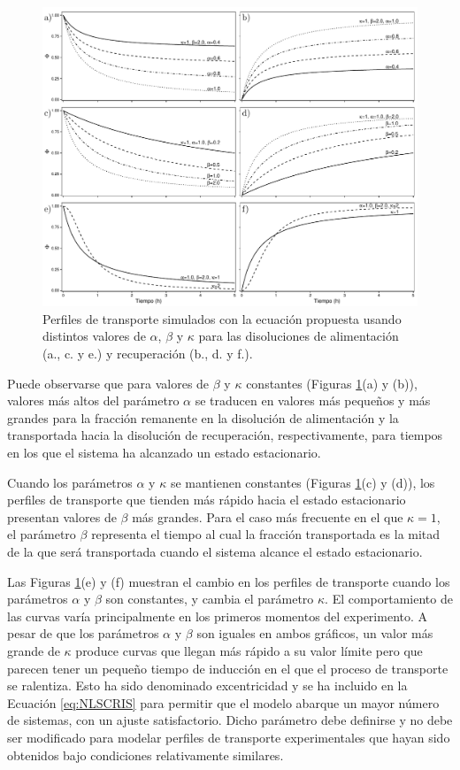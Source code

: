\begin{figure}[htbp]
    \centering
    \includegraphics[width = \textwidth]{chap2/images/thesis-models.pdf}
    \caption[Perfiles de transporte simulados con la ecuación propuesta.]{Perfiles de transporte simulados con la ecuación propuesta usando distintos valores de $\alpha$, $\beta$ y $\kappa$ para las disoluciones de alimentación (a., c. y e.) y recuperación (b., d. y f.).}
    \label{fig:Modelssim}
\end{figure}

Puede observarse que para valores de $\beta$ y $\kappa$ constantes (Figuras \ref{fig:Modelssim}(a) y (b)), valores más altos del parámetro $\alpha$ se traducen en valores más pequeños y más grandes para la fracción remanente en la disolución de alimentación y la transportada hacia la disolución de recuperación, respectivamente, para tiempos en los que el sistema ha alcanzado un estado estacionario. 

Cuando los parámetros $\alpha$ y $\kappa$ se mantienen constantes (Figuras \ref{fig:Modelssim}(c) y (d)), los perfiles de transporte que tienden más rápido hacia el estado estacionario presentan valores de $\beta$ más grandes. Para el caso más frecuente en el que $\kappa=1$, el parámetro $\beta$ representa el tiempo al cual la fracción transportada es la mitad de la que será transportada  cuando el sistema alcance el estado estacionario.

Las Figuras \ref{fig:Modelssim}(e) y (f) muestran el cambio en los perfiles de transporte cuando los parámetros $\alpha$ y $\beta$ son constantes, y cambia el parámetro $\kappa$. El comportamiento de las curvas varía principalmente en los primeros momentos del experimento. A pesar de que los parámetros $\alpha$ y $\beta$ son iguales en ambos gráficos, un valor más grande de $\kappa$ produce curvas que llegan más rápido a su valor límite pero que parecen tener un pequeño tiempo de inducción en el que el proceso de transporte se ralentiza. Esto ha sido denominado excentricidad y se ha incluido en la Ecuación \ref{eq:NLSCRIS} para permitir que el modelo abarque un mayor número de sistemas, con un ajuste satisfactorio. Dicho parámetro debe definirse y no debe ser modificado para modelar perfiles de transporte experimentales que hayan sido obtenidos bajo condiciones relativamente similares.


